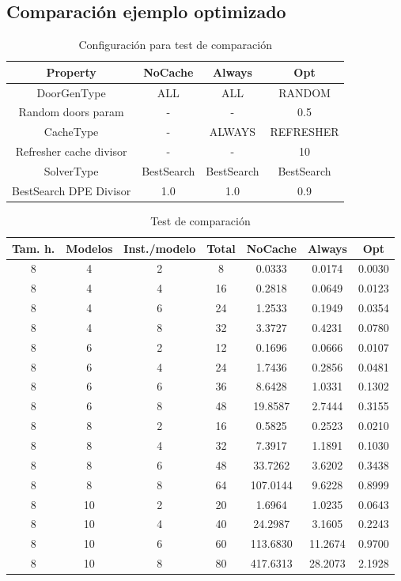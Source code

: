 \subsection{Comparación ejemplo optimizado}

\begin{table}[H]
\begin{center}
	\begin{tabular}{ | c | c | c | c | }
\hline
Property & NoCache & Always & Opt \\ \hline
DoorGenType & ALL & ALL & RANDOM \\
Random doors param & - & - & 0.5 \\
CacheType & - & ALWAYS & REFRESHER \\
Refresher cache divisor & - & - & 10 \\
SolverType & BestSearch & BestSearch & BestSearch \\
BestSearch DPE Divisor & 1.0 & 1.0 & 0.9 \\
\hline
	\end{tabular}
\end{center}
\caption{Configuración para test de comparación}
\label{table:cfg-comp}
\end{table}


\begin{table}[H]
\begin{center}
	\begin{tabular}{ | c | c | c | c | c | c | c | }
\hline
Tam. h. & Modelos & Inst./modelo & Total & NoCache & Always & Opt \\ \hline 
8 & 4 & 2 & 8 & 0.0333 & 0.0174 & 0.0030 \\ 
8 & 4 & 4 & 16 & 0.2818 & 0.0649 & 0.0123 \\ 
8 & 4 & 6 & 24 & 1.2533 & 0.1949 & 0.0354 \\ 
8 & 4 & 8 & 32 & 3.3727 & 0.4231 & 0.0780 \\ 
8 & 6 & 2 & 12 & 0.1696 & 0.0666 & 0.0107 \\ 
8 & 6 & 4 & 24 & 1.7436 & 0.2856 & 0.0481 \\ 
8 & 6 & 6 & 36 & 8.6428 & 1.0331 & 0.1302 \\ 
8 & 6 & 8 & 48 & 19.8587 & 2.7444 & 0.3155 \\ 
8 & 8 & 2 & 16 & 0.5825 & 0.2523 & 0.0210 \\ 
8 & 8 & 4 & 32 & 7.3917 & 1.1891 & 0.1030 \\ 
8 & 8 & 6 & 48 & 33.7262 & 3.6202 & 0.3438 \\ 
8 & 8 & 8 & 64 & 107.0144 & 9.6228 & 0.8999 \\ 
8 & 10 & 2 & 20 & 1.6964 & 1.0235 & 0.0643 \\
8 & 10 & 4 & 40 & 24.2987 & 3.1605 & 0.2243 \\
8 & 10 & 6 & 60 & 113.6830 & 11.2674 & 0.9700 \\
8 & 10 & 8 & 80 & 417.6313 & 28.2073 & 2.1928 \\
\hline
	\end{tabular}
\end{center}
\caption{Test de comparación}
\label{table:comp}
\end{table}




